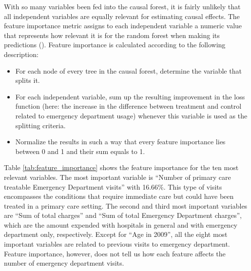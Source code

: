 With so many variables been fed into the causal forest, it is fairly unlikely that all independent variables are equally relevant for estimating causal effects. The feature importance metric assigns to each independent variable a numeric value that represents how relevant it is for the random forest when making its predictions (\cite{hastieElementsStatisticalLearning2009}). Feature importance is calculated according to the following description:

\begin{itemize}
  \item For each node of every tree in the causal forest, determine the variable that splits it. 
  \item For each independent variable, sum up the resulting improvement in the loss function (here: the increase in the difference between treatment and control related to emergency department usage) whenever this variable is used as the splitting criteria.
  \item Normalize the results in such a way that every feature importance lies between 0 and 1 and their sum equals to 1.
\end{itemize}

Table \ref{tab:feature_importance} shows the feature importance for the ten most relevant variables. The most important variable is ``Number of primary care treatable Emergency Department visits'' with 16.66\%. This type of visits encompasses the conditions that require immediate care but could have been treated in a primary care setting. The second and third most important variables are ``Sum of total charges'' and ``Sum of total Emergency Department charges'', which are the amount expended with hospitals in general and with emergency department only, respectively. Except for ``Age in 2009'', all the eight most important variables are related to previous visits to emergency department. Feature importance, however, does not tell us how each feature affects the number of emergency department visits. 

